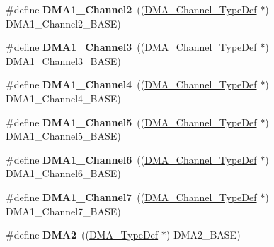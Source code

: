 \begin{DoxyCompactItemize}
\item 
\mbox{\label{group___peripheral__declaration_ga23d7631dd10c645e06971b2543ba2949}} 
\#define {\bfseries D\+M\+A1\+\_\+\+Channel2}~((\hyperlink{struct_d_m_a___channel___type_def}{D\+M\+A\+\_\+\+Channel\+\_\+\+Type\+Def} $\ast$) D\+M\+A1\+\_\+\+Channel2\+\_\+\+B\+A\+SE)
\item 
\mbox{\label{group___peripheral__declaration_gacf7b6093a37b306d7f1f50b2f200f0d0}} 
\#define {\bfseries D\+M\+A1\+\_\+\+Channel3}~((\hyperlink{struct_d_m_a___channel___type_def}{D\+M\+A\+\_\+\+Channel\+\_\+\+Type\+Def} $\ast$) D\+M\+A1\+\_\+\+Channel3\+\_\+\+B\+A\+SE)
\item 
\mbox{\label{group___peripheral__declaration_gad2c42743316bf64da557130061b1f56a}} 
\#define {\bfseries D\+M\+A1\+\_\+\+Channel4}~((\hyperlink{struct_d_m_a___channel___type_def}{D\+M\+A\+\_\+\+Channel\+\_\+\+Type\+Def} $\ast$) D\+M\+A1\+\_\+\+Channel4\+\_\+\+B\+A\+SE)
\item 
\mbox{\label{group___peripheral__declaration_ga06ff98ddef3c962795d2e2444004abff}} 
\#define {\bfseries D\+M\+A1\+\_\+\+Channel5}~((\hyperlink{struct_d_m_a___channel___type_def}{D\+M\+A\+\_\+\+Channel\+\_\+\+Type\+Def} $\ast$) D\+M\+A1\+\_\+\+Channel5\+\_\+\+B\+A\+SE)
\item 
\mbox{\label{group___peripheral__declaration_gac013c4376e4797831b5ddd2a09519df8}} 
\#define {\bfseries D\+M\+A1\+\_\+\+Channel6}~((\hyperlink{struct_d_m_a___channel___type_def}{D\+M\+A\+\_\+\+Channel\+\_\+\+Type\+Def} $\ast$) D\+M\+A1\+\_\+\+Channel6\+\_\+\+B\+A\+SE)
\item 
\mbox{\label{group___peripheral__declaration_ga4f9c23b3d1add93ed206b5c9afa5cda3}} 
\#define {\bfseries D\+M\+A1\+\_\+\+Channel7}~((\hyperlink{struct_d_m_a___channel___type_def}{D\+M\+A\+\_\+\+Channel\+\_\+\+Type\+Def} $\ast$) D\+M\+A1\+\_\+\+Channel7\+\_\+\+B\+A\+SE)
\item 
\mbox{\label{group___peripheral__declaration_ga506520140eec1708bc7570c49bdf972d}} 
\#define {\bfseries D\+M\+A2}~((\hyperlink{struct_d_m_a___type_def}{D\+M\+A\+\_\+\+Type\+Def} $\ast$) D\+M\+A2\+\_\+\+B\+A\+SE)

\end{DoxyCompactItemize}
